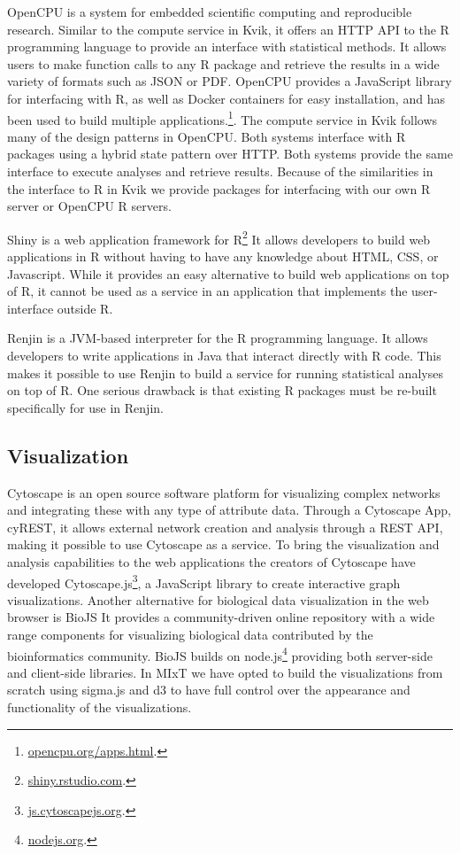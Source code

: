 OpenCPU is a system for embedded scientific computing and reproducible
research.\cite{opencpu} Similar to the compute service in Kvik, it offers an
HTTP API to the R programming language to provide an interface with statistical
methods. It allows users to make function calls to any R package and retrieve
the results in a wide variety of formats such as JSON or PDF. 
OpenCPU provides a JavaScript library for interfacing with R, as well as Docker
containers for easy installation, and has been used to build multiple
applications.\footnote{\url{opencpu.org/apps.html}.}. The compute service in
Kvik follows many of the design patterns in OpenCPU. Both systems interface with
R packages using a hybrid state pattern over HTTP. Both systems provide the same
interface to execute analyses and retrieve results.  Because of the similarities
in the interface to R in Kvik we provide packages for interfacing with our own R
server or OpenCPU R servers.

Shiny is a web application framework for R\footnote{\url{shiny.rstudio.com}.}
It allows developers to build web applications in R without having to have any
knowledge about HTML, CSS, or Javascript. While it provides an easy alternative
to build web applications on top of R, it cannot be used as a service in an
application that implements the user-interface outside R.  

Renjin is a JVM-based interpreter for the R programming language.\cite{renjin}
It allows developers to write applications in Java that interact directly with R
code. This makes it possible to use Renjin to build a service for running
statistical analyses on top of R. One serious drawback is that existing R
packages must be re-built specifically for use in Renjin. 

\subsection*{Visualization} 
Cytoscape is an open source software platform for visualizing complex networks
and integrating these with any type of attribute
data.\cite{shannon2003cytoscape} Through a Cytoscape App, cyREST, it allows
external network creation and analysis through a REST API\cite{ono2015cyrest},
making it possible to use Cytoscape as a service.  To bring the visualization
and analysis capabilities to the web applications the creators of Cytoscape have
developed Cytoscape.js\footnote{\url{js.cytoscapejs.org}.}, a JavaScript library
to create interactive graph visualizations.  Another alternative for biological
data visualization in the web browser is BioJS It provides a community-driven
online repository with a wide range components for visualizing biological data
contributed by the bioinformatics community.\cite{gomez2013biojs} BioJS builds
on node.js\footnote{\url{nodejs.org}.} providing both server-side and
client-side libraries. In MIxT we have opted to build the visualizations from
scratch using sigma.js and d3 to have full control over the appearance and
functionality of the visualizations. 

